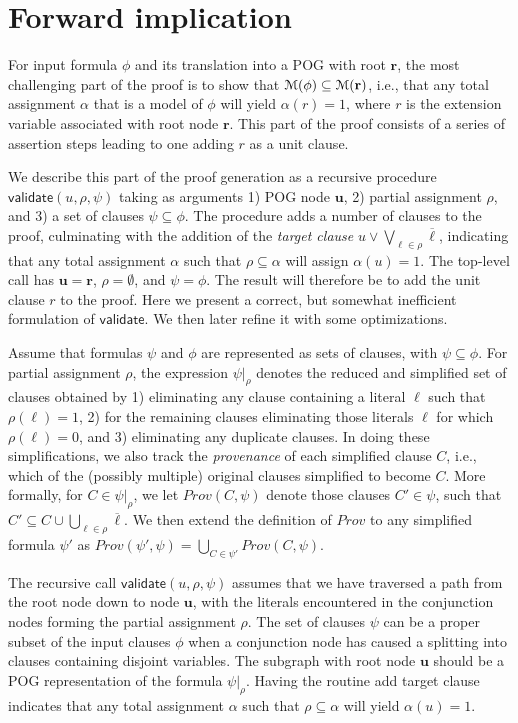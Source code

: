 \documentclass[letterpaper,USenglish,cleveref, autoref, thm-restate]{lipics-v2021}
\newcommand{\obar}[1]{\overline{#1}}
\newcommand{\lit}{\ell}
\newcommand{\assign}{\alpha}
\newcommand{\passign}{\rho}
\newcommand{\modelset}{{\cal M}}
\newcommand{\validate}{\textsf{validate}}
\newcommand{\makenode}[1]{\mathbf{#1}}
\newcommand{\nodeu}{\makenode{u}}
\newcommand{\noder}{\makenode{r}}
\newcommand{\simplify}[2]{#1|_{#2}}
\newcommand{\prov}{\mathit{Prov}}
\begin{document}
\section{Forward implication}

For input formula $\phi$ and its translation into a POG with root
$\noder$, the most challenging part of the proof is to show that
$\modelset(\phi) \subseteq \modelset(\noder)$, i.e., that any total
assignment $\alpha$ that is a model of $\phi$ will yield $\assign(r) =
1$, where $r$ is the extension variable associated with root node
$\noder$.  This part of the proof consists of a series of assertion
steps leading to one adding $r$ as a unit clause.

We describe this part of the proof generation as a recursive procedure
$\validate(u, \passign, \psi)$ taking as arguments 1) POG node $\nodeu$, 2) partial assignment
$\passign$, and 3) a set of clauses $\psi \subseteq \phi$.
The procedure adds a number of clauses to the proof, culminating with 
the addition of the {\em target clause}
$u \lor \bigvee_{\lit \in \passign} \obar{\lit}$, indicating that any total
assignment $\assign$ such that $\passign \subseteq \assign$
will assign $\assign(u) = 1$.
The top-level call has $\nodeu = \noder$, $\passign = \emptyset$, and $\psi = \phi$.
The result will therefore be to add the unit clause $r$ to the proof.
Here we present a correct, but somewhat inefficient formulation of
$\validate$.  We then later refine it with some optimizations.

Assume that formulas $\psi$ and $\phi$ are
represented as sets of clauses, with $\psi \subseteq \phi$.
For partial assignment
$\passign$, the expression  $\simplify{\psi}{\passign}$ denotes the
reduced and simplified set of clauses obtained by 1) eliminating any
clause containing a literal $\lit$ such that $\passign(\lit) = 1$,
2) for the remaining clauses eliminating those literals $\lit$ for
which $\passign(\lit) = 0$, and 3) eliminating any duplicate clauses.
In doing these simplifications, we also track the {\em provenance}
of each simplified clause $C$, i.e., which of the (possibly multiple) original clauses simplified to become $C$.
More formally, for $C \in \simplify{\psi}{\passign}$, we let $\prov(C, \psi)$ denote
those clauses $C' \in \psi$, such that
$C' \subseteq C \cup \bigcup_{\lit \in \passign} \obar{\lit}$.
We then extend the definition of $\prov$ to any simplified formula
$\psi'$ as $\prov(\psi', \psi) = \bigcup_{C \in \psi'} \prov(C, \psi)$.

The recursive call $\validate(u, \passign, \psi)$ assumes that we have
traversed a path from the root node down to node $\nodeu$, with the
literals encountered in the conjunction nodes forming the partial
assignment $\passign$.  The set of clauses $\psi$ can be a proper
subset of the input clauses $\phi$ when a conjunction node has caused
a splitting into clauses containing disjoint variables.
The subgraph with root node $\nodeu$ should be a POG representation of the formula
$\simplify{\psi}{\passign}$.  Having the
routine add target clause indicates that any total assignment 
$\assign$ such that $\passign \subseteq \assign$ will yield $\alpha(u) = 1$.
\end{document}
